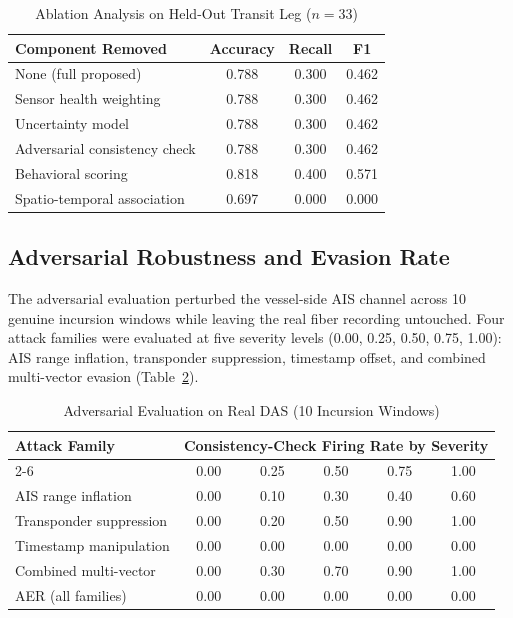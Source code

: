 \documentclass[conference]{IEEEtran}
\begin{document}
\begin{table}[!t]
\caption{Ablation Analysis on Held-Out Transit Leg ($n=33$)}
\label{tab:ablation}
\centering
\footnotesize
\begin{tabular}{@{}lccc@{}}
\toprule
Component Removed & Accuracy & Recall & F1 \\
\midrule
None (full proposed) & 0.788 & 0.300 & 0.462 \\
Sensor health weighting & 0.788 & 0.300 & 0.462 \\
Uncertainty model & 0.788 & 0.300 & 0.462 \\
Adversarial consistency check & 0.788 & 0.300 & 0.462 \\
Behavioral scoring & 0.818 & 0.400 & 0.571 \\
Spatio-temporal association & 0.697 & 0.000 & 0.000 \\
\bottomrule
\end{tabular}
\end{table}

\subsection{Adversarial Robustness and Evasion Rate}
\label{sec:adv-results}
The adversarial evaluation perturbed the vessel-side AIS channel across 10
genuine incursion windows while leaving the real fiber recording untouched.
Four attack families were evaluated at five severity levels (0.00, 0.25, 0.50,
0.75, 1.00): AIS range inflation, transponder suppression, timestamp offset,
and combined multi-vector evasion (Table~\ref{tab:adv}).

\begin{table}[!t]
\caption{Adversarial Evaluation on Real DAS (10 Incursion Windows)}
\label{tab:adv}
\centering
\footnotesize
\begin{tabular}{@{}lccccc@{}}
\toprule
\multirow{2}{*}{Attack Family} & \multicolumn{5}{c}{Consistency-Check Firing Rate by Severity} \\
\cmidrule(l){2-6}
 & 0.00 & 0.25 & 0.50 & 0.75 & 1.00 \\
\midrule
AIS range inflation & 0.00 & 0.10 & 0.30 & 0.40 & 0.60 \\
Transponder suppression & 0.00 & 0.20 & 0.50 & 0.90 & 1.00 \\
Timestamp manipulation & 0.00 & 0.00 & 0.00 & 0.00 & 0.00 \\
Combined multi-vector & 0.00 & 0.30 & 0.70 & 0.90 & 1.00 \\
\midrule
AER (all families) & 0.00 & 0.00 & 0.00 & 0.00 & 0.00 \\
\bottomrule
\end{tabular}
\end{table}
\end{document}
